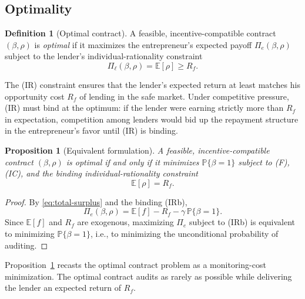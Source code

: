 \documentclass[11pt,a4paper,oneside]{book}
\def\E{\mathbb{E}}
\def\geq{\geqslant}
\renewcommand{\P}{\mathbb{P}}
\theoremstyle{plain}
\newtheorem{proposition}[theorem]{Proposition}
\theoremstyle{definition}
\newtheorem{definition}[theorem]{Definition}
\theoremstyle{remark}
\numberwithin{equation}{chapter}
\begin{document}
\subsection{Optimality}

\begin{definition}[Optimal contract]\label{def:GH-optimal}
A feasible, incentive-compatible contract $(\beta, \rho)$ is \emph{optimal} if it maximizes the entrepreneur's expected payoff $\Pi_e(\beta, \rho)$ subject to the lender's individual-rationality constraint
\begin{equation}\label{eq:IR}
  \Pi_\ell(\beta, \rho) = \E[\rho] \geq R_f.
  \tag{IR}
\end{equation}
\end{definition}

The (IR) constraint ensures that the lender's expected return at least matches his opportunity cost $R_f$ of lending in the safe market.
Under competitive pressure, (IR) must bind at the optimum: if the lender were earning strictly more than $R_f$ in expectation, competition among lenders would bid up the repayment structure in the entrepreneur's favor until (IR) is binding.

\begin{proposition}[Equivalent formulation]\label{prop:GH-equiv}
A feasible, incentive-compatible contract $(\beta, \rho)$ is optimal if and only if it minimizes $\P\{\beta = 1\}$ subject to \textup{(F)}, \textup{(IC)}, and the binding individual-rationality constraint
\begin{equation}\label{eq:IRb}
  \E[\rho] = R_f.
  \tag{IRb}
\end{equation}
\end{proposition}

\begin{proof}
By \eqref{eq:total-surplus} and the binding (IRb),
\begin{equation*}
  \Pi_e(\beta, \rho) = \E[f] - R_f - \gamma \, \P\{\beta = 1\}.
\end{equation*}
Since $\E[f]$ and $R_f$ are exogenous, maximizing $\Pi_e$ subject to (IRb) is equivalent to minimizing $\P\{\beta = 1\}$, i.e., to minimizing the unconditional probability of auditing.
\end{proof}

Proposition~\ref{prop:GH-equiv} recasts the optimal contract problem as a monitoring-cost minimization.
The optimal contract audits as rarely as possible while delivering the lender an expected return of $R_f$.
\end{document}
